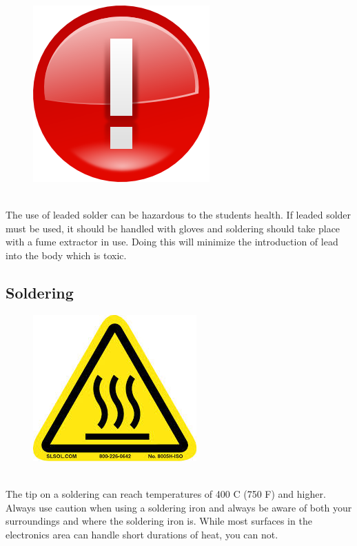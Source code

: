 \begin{framed}
\begin{figure}
\includegraphics[width=\linewidth]{images/important_icon.png}
\end{figure}
\ \\
The use of leaded solder can be hazardous to the students health.  If leaded solder must be used, it should be handled with gloves and soldering should take place with a fume extractor in use.  Doing this will minimize the introduction of lead into the body which is toxic.
\end{framed}

\subsection{Soldering}

\begin{framed}
\begin{figure}
\includegraphics[width=.7in]{images/burn_hazard}
\end{figure}
\ \\
The tip on a soldering can reach temperatures of 400 C (750 F) and higher.  Always use caution when using a soldering iron and always be aware of both your surroundings and where the soldering iron is.  While most surfaces in the electronics area can handle short durations of heat, you can not.
\end{framed}

